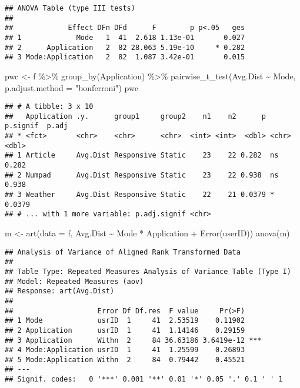 \documentclass[
]{article}
\newenvironment{Shaded}{\begin{snugshade}}{\end{snugshade}}
\newcommand{\AttributeTok}[1]{\textcolor[rgb]{0.77,0.63,0.00}{#1}}
\newcommand{\FunctionTok}[1]{\textcolor[rgb]{0.00,0.00,0.00}{#1}}
\newcommand{\NormalTok}[1]{#1}
\newcommand{\OtherTok}[1]{\textcolor[rgb]{0.56,0.35,0.01}{#1}}
\newcommand{\SpecialCharTok}[1]{\textcolor[rgb]{0.00,0.00,0.00}{#1}}
\newcommand{\StringTok}[1]{\textcolor[rgb]{0.31,0.60,0.02}{#1}}
\begin{document}
\begin{verbatim}
## ANOVA Table (type III tests)
## 
##             Effect DFn DFd      F        p p<.05   ges
## 1             Mode   1  41  2.618 1.13e-01       0.027
## 2      Application   2  82 28.063 5.19e-10     * 0.282
## 3 Mode:Application   2  82  1.087 3.42e-01       0.015
\end{verbatim}

\begin{Shaded}
\begin{Highlighting}[]
\NormalTok{pwc }\OtherTok{\textless{}{-}}\NormalTok{ f }\SpecialCharTok{\%\textgreater{}\%} \FunctionTok{group\_by}\NormalTok{(Application) }\SpecialCharTok{\%\textgreater{}\%} \FunctionTok{pairwise\_t\_test}\NormalTok{(Avg.Dist }\SpecialCharTok{\textasciitilde{}}\NormalTok{ Mode, }\AttributeTok{p.adjust.method =} \StringTok{"bonferroni"}\NormalTok{)}
\NormalTok{pwc}
\end{Highlighting}
\end{Shaded}

\begin{verbatim}
## # A tibble: 3 x 10
##   Application .y.      group1     group2    n1    n2      p p.signif  p.adj
## * <fct>       <chr>    <chr>      <chr>  <int> <int>  <dbl> <chr>     <dbl>
## 1 Article     Avg.Dist Responsive Static    23    22 0.282  ns       0.282 
## 2 Numpad      Avg.Dist Responsive Static    23    22 0.938  ns       0.938 
## 3 Weather     Avg.Dist Responsive Static    22    21 0.0379 *        0.0379
## # ... with 1 more variable: p.adj.signif <chr>
\end{verbatim}

\begin{Shaded}
\begin{Highlighting}[]
\NormalTok{m }\OtherTok{\textless{}{-}} \FunctionTok{art}\NormalTok{(}\AttributeTok{data =}\NormalTok{ f, Avg.Dist }\SpecialCharTok{\textasciitilde{}}\NormalTok{ Mode }\SpecialCharTok{*}\NormalTok{ Application }\SpecialCharTok{+} \FunctionTok{Error}\NormalTok{(userID))}
\FunctionTok{anova}\NormalTok{(m)}
\end{Highlighting}
\end{Shaded}

\begin{verbatim}
## Analysis of Variance of Aligned Rank Transformed Data
## 
## Table Type: Repeated Measures Analysis of Variance Table (Type I) 
## Model: Repeated Measures (aov)
## Response: art(Avg.Dist)
## 
##                    Error Df Df.res  F value     Pr(>F)    
## 1 Mode             usrID  1     41  2.53519    0.11902    
## 2 Application      usrID  1     41  1.14146    0.29159    
## 3 Application      Withn  2     84 36.63186 3.6419e-12 ***
## 4 Mode:Application usrID  1     41  1.25599    0.26893    
## 5 Mode:Application Withn  2     84  0.79442    0.45521    
## ---
## Signif. codes:   0 '***' 0.001 '**' 0.01 '*' 0.05 '.' 0.1 ' ' 1
\end{verbatim}
\end{document}

